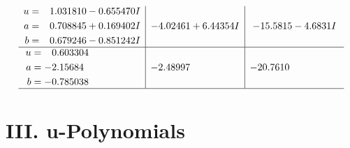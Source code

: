 \documentclass[1p]{elsarticle_modified}
\theoremstyle{definition}
\begin{document}
$$\begin{array}{c|c|c}
\begin{aligned}
u &= \phantom{-}1.031810 - 0.655470 I \\
a &= \phantom{-}0.708845 + 0.169402 I \\
b &= \phantom{-}0.679246 - 0.851242 I\end{aligned}
 & -4.02461 + 6.44354 I & -15.5815 - 4.6831 I \\ \hline\begin{aligned}
u &= \phantom{-}0.603304\phantom{ +0.000000I} \\
a &= -2.15684\phantom{ +0.000000I} \\
b &= -0.785038\phantom{ +0.000000I}\end{aligned}
 & -2.48997\phantom{ +0.000000I} & -20.7610\phantom{ +0.000000I}\\
 \hline 
 \end{array}$$\newpage
\newpage\renewcommand{\arraystretch}{1}
\centering \section*{ III. u-Polynomials}
\end{document}
